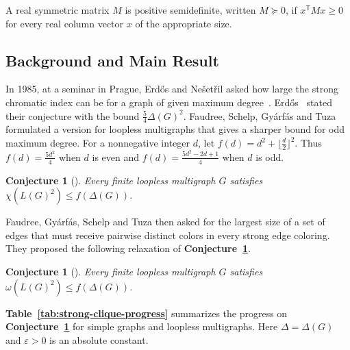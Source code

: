 \documentclass[preprint,11pt,numbers]{elsarticle-arxiv}
\numberwithin{equation}{section}
\newtheorem{conjecture}[theorem]{Conjecture}
\theoremstyle{definition}
\begin{document}
A real symmetric matrix $M$ is positive semidefinite, written
$M\succeq0$, if $x^{\mathsf T}Mx\geq0$ for every real column vector
$x$ of the appropriate size.

\subsection{Background and Main Result}\label{sec:background}

In 1985, at a seminar in Prague, Erd\H{o}s and Ne\v{s}et\v{r}il asked
how large the strong chromatic index can be for a graph of given
maximum degree~\cite{FGST1989,ErdosNesetril1989}. Erd\H{o}s~\cite{Erdos1988}
stated their conjecture with the bound $\frac{5}{4}\Delta(G)^2$.
Faudree, Schelp, Gy\'arf\'as and Tuza~\cite{FGST1990} formulated a
version for loopless multigraphs that gives a sharper bound for odd
maximum degree. For a nonnegative integer $d$, let
$f(d)=d^2+\lfloor\frac{d}{2}\rfloor^2$. Thus $f(d)=\frac{5d^2}{4}$
when $d$ is even and $f(d)=\frac{5d^2-2d+1}{4}$ when $d$ is odd.

\begin{conjecture}[\cite{FGST1990}]
\label{conj:strong-edge-coloring}
Every finite loopless multigraph $G$ satisfies
$\chi(L(G)^2)\leq f(\Delta(G))$.
\end{conjecture}

Faudree, Gy\'arf\'as, Schelp and Tuza then asked for the largest size of
a set of edges that must receive pairwise distinct colors in every
strong edge coloring. They proposed the following relaxation of
\textbf{Conjecture~\ref{conj:strong-edge-coloring}}.

\begin{conjecture}[\cite{FGST1990}]\label{conj:fgst}
Every finite loopless multigraph $G$ satisfies
$\omega(L(G)^2)\leq f(\Delta(G))$.
\end{conjecture}

\textbf{Table~\ref{tab:strong-clique-progress}} summarizes the progress
on \textbf{Conjecture~\ref{conj:fgst}} for simple graphs and loopless
multigraphs. Here $\Delta=\Delta(G)$ and $\varepsilon>0$ is an absolute
constant.
\end{document}
